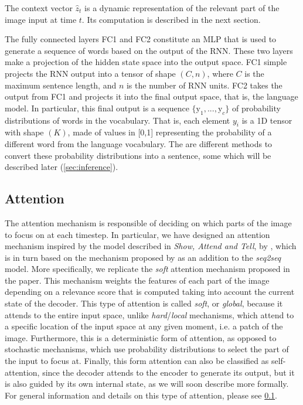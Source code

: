 The context vector $\hat{z}_t$ is a dynamic representation of the relevant part of the image input at time $t$. Its computation is described in the next section.

The fully connected layers FC1 and FC2 constitute an MLP that is used to generate a sequence of words based on the output of the RNN. These two layers make a projection of the hidden state space into the output space. FC1 simple projects the RNN output into a tensor of shape $(C, n)$, where $C$ is the maximum sentence length, and $n$ is the number of RNN units. FC2 takes the output from FC1 and projects it into the final output space, that is, the language model. In particular, this final output is a sequence  $\{\text{y}_1,..., \text{y}_c\}$ of probability distributions of words in the vocabulary. That is, each element $y_i$ is a 1D tensor with shape $(K)$, made of values in [0,1] representing the probability of a different word from the language vocabulary. The are different methods to convert these probability distributions into a sentence, some which will be described later (\cref{sec:inference}).

\subsection{Attention}\label{subsec:attention}

The attention mechanism is responsible of deciding on which parts of the image to focus on at each timestep. In particular, we have designed an attention mechanism inspired by the model described in \textit{Show, Attend and Tell}, by \citet{Xu2015}, which is in turn based on the mechanism proposed by \citet{Bahdanau2015} as an addition to the \textit{seq2seq} model. More specifically, we replicate the  \textit{soft} attention mechanism proposed in the paper. This mechanism weights the features of each part of the image depending on a relevance score that is computed taking into account the current state of the decoder. This type of attention is called \textit{soft}, or \textit{global}, because it attends to the entire input space, unlike \textit{hard}/\textit{local} mechanisms, which attend to a specific location of the input space at any given moment, i.e. a patch of the image. Furthermore, this is a deterministic form of attention, as opposed to stochastic mechanisms, which use probability distributions to select the part of the input to focus at. Finally, this form attention can also be classified as self-attention, since the decoder attends to the encoder to generate its output, but it is also guided by its own internal state, as we will soon describe more formally. For general information and details on this type of attention, please see \cref{subsec:attention}. 

